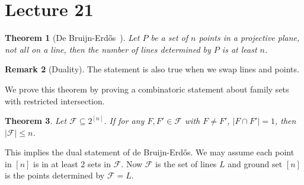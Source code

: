 \documentclass{article}
\newtheorem{theorem}{Theorem}[section]
\theoremstyle{definition}
\newtheorem{remark}[theorem]{Remark}
\def\Erdos{Erd\H{o}s}
\begin{document}
\newpage
\section{Lecture 21}

\begin{theorem}[De Bruijn-\Erdos{}~\cite{bruijn1951colour}]
    Let $P$ be a set of $n$ points in a projective plane, not all on a line, then the number of lines determined by $P$ is at least $n$.
\end{theorem}

\begin{remark}[Duality]
    The statement is also true when we swap lines and points.
\end{remark}

We prove this theorem by proving a combinatoric statement about family sets with restricted intersection.

\begin{theorem}\label{De bruijn-erdos}
    Let $\mathcal{F}\subseteq 2^{[n]}$. If for any $F,F' \in \mathcal{F}$ with $F\neq F'$, $|F\cap F'|=1$, then $|\mathcal{F}|\leq n$.
\end{theorem}

This implies the dual statement of de Bruijn-\Erdos{}. We may assume each point in $[n]$ is in at least $2$ sets in $\mathcal{F}$. Now $\mathcal{F}$ is the set of lines $L$ and ground set $[n]$ is the points determined by $\mathcal{F}=L$.
\end{document}
